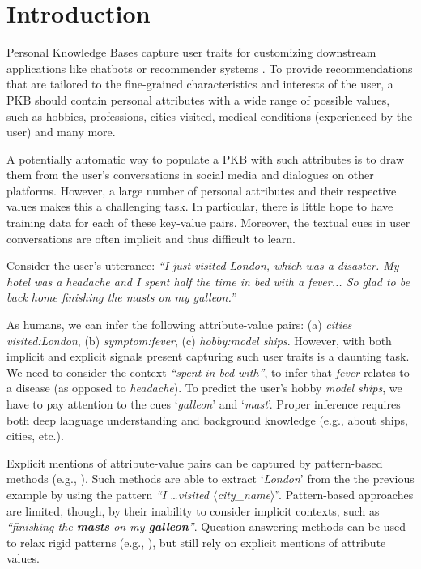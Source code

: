 \section{Introduction}

 Personal Knowledge Bases 
capture user traits
for %
customizing
downstream applications like chatbots
or recommender systems \cite{Balog:2019:TSE:3331184.3331211}.
To provide recommendations that are tailored to the fine-grained characteristics and interests of the user, a PKB should contain personal attributes with a wide range of possible values, such as hobbies, professions, cities visited, medical conditions 
(experienced by the user) and many more.

A potentially automatic way to populate a PKB with such attributes is to 
draw them from the user's conversations in social media and dialogues on other platforms. However, a large number of personal attributes 
and their respective values makes this a challenging task. In particular, there is little hope to have training data for each of these key-value pairs.
Moreover, the textual cues in user conversations are often implicit
and thus difficult to learn.

Consider the user's utterance:
\textit{``I just visited London, which was a disaster. My hotel was a headache and I spent half the time in bed with a fever... So glad to be back home finishing the masts on my galleon.''}

As humans, we can infer the following attribute-value pairs: 
(a) \textit{cities visited:London}, (b) \textit{symptom:fever},
(c) \textit{hobby:model ships}. 
However, with both implicit and explicit signals present capturing such user traits is a daunting task.
We need to consider the context \textit{``spent in bed with''}, to infer that \textit{fever} relates to a disease (as opposed to \textit{headache}). 
To predict the user's hobby \textit{model ships}, we have to pay attention to the cues `\textit{galleon}' and `\textit{mast}'.
Proper inference requires both deep language understanding and background knowledge
(e.g., about ships, cities,
etc.).

\vspace{0.1cm}
Explicit mentions of attribute-value pairs can be captured by pattern-based methods (e.g., \cite{dial7,Yen:2019:PKB:3331184.3331209}).
Such methods are able to extract `\textit{London}' 
from the the previous example by using the pattern \textit{``I \dots visited $\langle$city\_name$\rangle$}''.  
Pattern-based approaches are limited, though, by
their inability to consider implicit contexts, such as %
{\em ``finishing the \textbf{masts} on my \textbf{galleon}''}. 
Question answering methods can be used to relax rigid patterns 
(e.g., \cite{levy2017zero}), 
but still rely on explicit mentions of attribute values.

